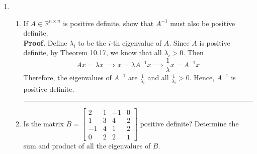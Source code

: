 \documentclass[12pt]{article}
\numberwithin{equation}{section}
\newenvironment{proof}[1][Proof]{\textbf{#1.} }{\ \rule{0.5em}{0.5em}}
\begin{document}
\begin{enumerate}
\begin{enumerate}
        \end{enumerate}
    \item \begin{enumerate}\item If $A\in\mathbb{R}^{n\times n}$ is positive definite, show that $A^{-1}$ must also be positive definite.\\
        \begin{proof} Define $\lambda_i$ to be the $i$-th eigenvalue of $A$. Since $A$ is positive definite, by Theorem 10.17, we know that all $\lambda_i>0$. Then
        $$Ax=\lambda x\implies x=\lambda A^{-1}x\implies \frac{1}{\lambda}x=A^{-1}x$$
        Therefore, the eigenvalues of $A^{-1}$ are $\frac{1}{\lambda_{i}}$ and all $\frac{1}{\lambda_i}>0.$ Hence, $A^{-1}$ is positive definite.
        \end{proof}

        \item Is the matrix $B=\left[\begin{array}{cccc} 2&1&-1&0\\1&3&4&2\\-1&4&1&2\\0&2&2&1\end{array}\right]$ positive definite? Determine the sum and product of all the eigenvalues of $B$.\\


\end{enumerate}
\end{enumerate}
\end{document}
